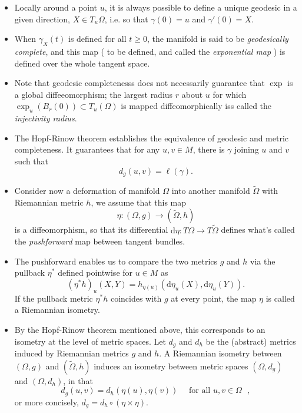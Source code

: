 \documentclass[12pt]{article}
\numberwithin{equation}{section}
\theoremstyle{definition}
\newcommand{		\rd		}	{	\textrm{d}					}
\newcommand{		\Oh		}	{	\Omega					}
\newcommand{		\1		}	{	\bm{1}					}%
\begin{document}
\begin{itemize}

\item Locally around a point $u$, it is always possible to define a unique geodesic in a given direction, $X \in T_u \Omega$, i.e. so that $\gamma(0) = u$ and $\gamma'(0) = X$. 

\item When $\gamma_X(t)$ is defined for all $t \geq 0$, the manifold is said to be \emph{geodesically complete}, and this map ( to be defined, and called the \emph{exponential map} ) is defined over the whole tangent space. 

\item Note that geodesic completenesss does not necessarily guarantee that $\exp$ is a global diffeeomorphism; the largest radius $r$ about $u$ for which $\exp_u (B_r(0)) \subset T_u (\Oh)$ is mapped diffeomorphically iss called the \emph{injectivity radius}.

\item The Hopf-Rinow theorem establishes the equivalence of geodesic and metric completeness. It guarantees that for any $u,v \in M$, there is $\gamma$ joining $u$ and $v$ such that 
$$
d_g (u,v) = \ell(\gamma).
$$

\item Consider now a deformation of manifold $\Oh$ into another manifold $\tilde{\Oh}$ with Riemannian metric $h$, we assume that this map
$$
\eta : (\Oh,g) \to (\tilde{\Oh}, h) 
$$
is a diffeomorphism, so that its differential $\rd \eta : T \Oh \to T \tilde{\Oh}$ defines what's called the \emph{pushforward} map between tangent bundles.

\item The pushforward enables us to compare the two metrics $g$ and $h$ via the pullback $\eta^*$ defined pointwise for $u \in M$ as
$$
(\eta^* h)_u (X,Y) = h_{\eta(u)}( \rd \eta_u(X), \rd \eta_u(Y) ) .
$$
If the pullback metric $\eta^*h$ coincides with $g$ at every point, the map $\eta$ is called a Riemannian isometry.

\item By the Hopf-Rinow theorem mentioned above, this corresponds to an isometry at the level of metric spaces. Let $d_g$ and $d_h$ be the (abstract) metrics induced by Riemannian metrics $g$ and $h$. A Riemannian isometry between $(\Oh,g)$ and $( \tilde{\Oh}, h)$ induces an isometry between metric spaces $(\Oh, d_g)$ and $(\Oh, d_h)$, in that
$$
d_g(u,v) = d_h(\eta(u), \eta(v)) \quad \text{ for all $u,v \in \Oh$ } ,
$$
or more concisely, $d_g = d_h \circ (\eta \times \eta)$. 


\end{itemize}
\end{document}
